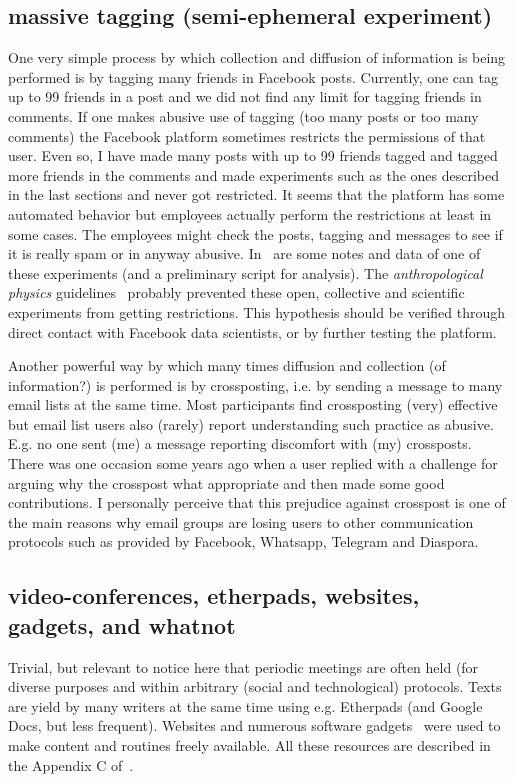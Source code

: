 \documentclass[a4paper]{article}
\begin{document}
\subsection{massive tagging (semi-ephemeral experiment)}
One very simple process by which collection and diffusion of information is being performed
is by tagging many friends in Facebook posts.
Currently, one can tag up to 99 friends in a post
and we did not find any limit for tagging friends in comments.
If one makes abusive use of tagging (too many posts or too many comments)
the Facebook platform sometimes restricts the permissions of that user.
Even so, I have made many posts with up to 99 friends tagged and tagged more
friends in the comments and made experiments such as the ones described in the
last sections and never got restricted.
It seems that the platform has some automated behavior but employees actually
perform the restrictions at least in some cases.
The employees might check the posts, tagging and messages to see if it is
really spam or in anyway abusive.
In~\cite{anExp} are some notes and data of one of these experiments (and a preliminary script for analysis).
The \emph{anthropological physics} guidelines~\cite{anPhy,anPhy2} probably prevented
these open, collective and scientific experiments from getting restrictions.
This hypothesis should be verified through direct contact with Facebook data scientists,
or by further testing the platform.

Another powerful way by which many times diffusion and collection (of information?) is performed
is by crossposting, i.e. by sending a message to many email lists
at the same time.
Most participants find crossposting (very) effective but email list users also (rarely) report understanding such practice as abusive.
E.g. no one sent (me) a message reporting discomfort with (my) crossposts.
There was one occasion some years ago when a user replied with a challenge for
arguing why the crosspost what appropriate and then made some good contributions.
I personally perceive that this prejudice against crosspost is one of the main reasons
why email groups are losing users to other communication protocols such as provided by
Facebook, Whatsapp, Telegram and Diaspora.

\subsection{video-conferences, etherpads, websites, gadgets, and whatnot}\label{video}
Trivial, but relevant to notice here that periodic meetings are often held
(for diverse purposes and within arbitrary (social and technological) protocols.
Texts are yield by many writers at the same time using e.g. Etherpads (and Google Docs, but less frequent).
Websites and numerous software gadgets~\cite{ttmRepos} were used to make content and routines
freely available. All these resources are described in the Appendix C of~\cite{thesis}.
      
\end{document}
